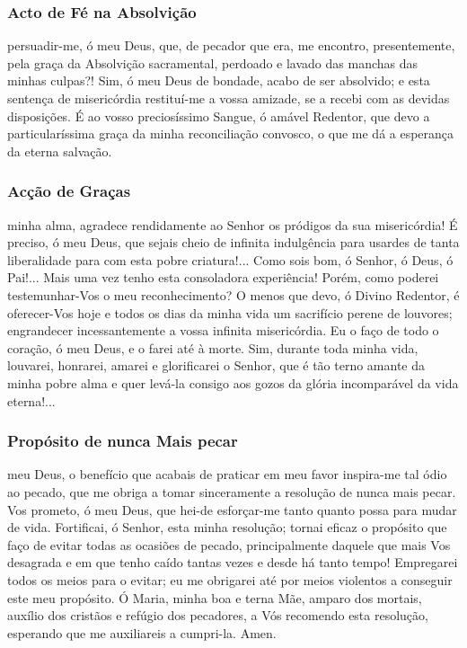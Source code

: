 \subsubsection{Acto de Fé na Absolvição}

 persuadir-me, ó meu Deus, que, de pecador que era, me encontro, presentemente, pela graça da Absolvição sacramental, perdoado e lavado das manchas das minhas culpas?! Sim, ó meu Deus de bondade, acabo de ser absolvido; e esta sentença de misericórdia restituí-me a vossa amizade, se a recebi com as devidas disposições. É ao vosso preciosíssimo Sangue, ó amável Redentor, que devo a particularíssima graça da minha reconciliação convosco, o que me dá a esperança da eterna salvação.

\subsubsection{Acção de Graças}

 minha alma, agradece rendidamente ao Senhor os pródigos da sua misericórdia! É preciso, ó meu Deus, que sejais cheio de infinita indulgência para usardes de tanta liberalidade para com esta pobre criatura!... Como sois bom, ó Senhor, ó Deus, ó Pai!... Mais uma vez tenho esta consoladora experiência! Porém, como poderei testemunhar-Vos o meu reconhecimento? O menos que devo, ó Divino Redentor, é oferecer-Vos hoje e todos os dias da minha vida um sacrifício perene de louvores; engrandecer incessantemente a vossa infinita misericórdia. Eu o faço de todo o coração, ó meu Deus, e o farei até à morte. Sim, durante toda minha vida, louvarei, honrarei, amarei e glorificarei o Senhor, que é tão terno amante da minha pobre alma e quer levá-la consigo aos gozos da glória incomparável da vida eterna!...

\subsubsection{Propósito de nunca Mais pecar}

 meu Deus, o benefício que acabais de praticar em meu favor inspira-me tal ódio ao pecado, que me obriga a tomar sinceramente a resolução de nunca mais pecar. Vos prometo, ó meu Deus, que hei-de esforçar-me tanto quanto possa para mudar de vida. Fortificai, ó Senhor, esta minha resolução; tornai eficaz o propósito que faço de evitar todas as ocasiões de pecado, principalmente daquele que mais Vos desagrada e em que tenho caído tantas vezes e desde há tanto tempo! Empregarei todos os meios para o evitar; eu me obrigarei até por meios violentos a conseguir este meu propósito. Ó Maria, minha boa e terna Mãe, amparo dos mortais, auxílio dos cristãos e refúgio dos pecadores, a Vós recomendo esta resolução, esperando que me auxiliareis a cumpri-la. Amen.
